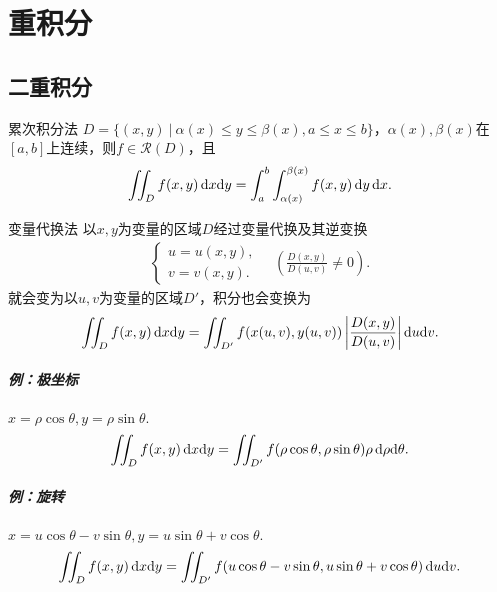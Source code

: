 \chapter{重积分}
\section{二重积分}
\begin{theorem}{累次积分法}{}
	$D=\{(x,y)~|~\alpha(x)\leqslant y\leqslant\beta(x),a\leqslant x\leqslant b\}$，$\alpha(x),\beta(x)$在$[a,b]$上连续，则$f\in\mathscr R(D)$，且
	\[
		\iint_Df(x,y)\mathop{}\!\mathrm{d} x\mathrm{d} y=\int_a^b\int_{\alpha(x)}^{\beta(x)}f(x,y)\mathop{}\!\mathrm{d} y\mathop{}\!\mathrm{d} x.
	\]
\end{theorem}
\begin{theorem}{变量代换法}{}
	以$x,y$为变量的区域$D$经过变量代换及其逆变换
	\begin{align*}
		\begin{cases}
			u=u(x,y), \\
			v=v(x,y).
		\end{cases}
		\quad\left(\frac{D(x,y)}{D(u,v)}\neq 0\right).
	\end{align*}
	就会变为以$u,v$为变量的区域$D'$，积分也会变换为
	\[
		\iint_Df(x,y)\mathop{}\!\mathrm{d} x\mathrm{d} y=\iint_{D'}f(x(u,v),y(u,v))\left|\frac{D(x,y)}{D(u,v)}\right|\mathop{}\!\mathrm{d} u\mathrm{d} v.
	\]
\end{theorem}
\paragraph{例：极坐标}$x=\rho\cos\theta,y=\rho\sin\theta.$
\[
	\iint_Df(x,y)\mathop{}\!\mathrm{d} x\mathrm{d} y=\iint_{D'}f(\rho\cos\theta,\rho\sin\theta)\rho\mathop{}\!\mathrm{d}\rho\mathrm{d}\theta.
\]
\paragraph{例：旋转}$x=u\cos\theta-v\sin\theta,y=u\sin\theta+v\cos\theta.$
\[
	\iint_Df(x,y)\mathop{}\!\mathrm{d} x\mathrm{d} y=\iint_{D'}f(u\cos\theta-v\sin\theta,u\sin\theta+v\cos\theta)\mathop{}\!\mathrm{d} u\mathrm{d} v.
\]
